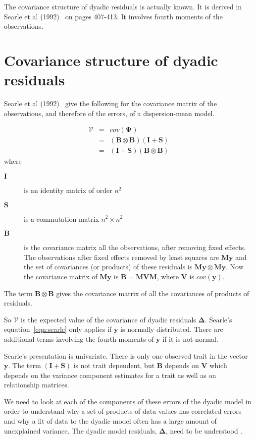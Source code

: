 \documentclass[titlepage]{article}  %
\begin{document}
The covariance structure of dyadic residuals is actually known. It is derived in Searle et al (1992)~\cite{sear:92} on pages 407-413. It involves fourth moments of the observations.

\section{Covariance structure of dyadic residuals}
 Searle et al (1992)~\cite{sear:92} give the following for the covariance matrix of the observations, and therefore of the errors, of a dispersion-mean model.

\begin{eqnarray}
\label{eqn:searle}
 \bm{\mathcal{V}} & = & cov(\bm{\Psi})  \\
          & = & (\bm{B} \otimes \bm{B}) (\bm{I} + \bm{S}) \\
          & = & (\bm{I} + \bm{S}) (\bm{B} \otimes \bm{B})
\end{eqnarray}
where
\begin{description}
\item[$\bm{I}$] is an identity matrix of order $n^{2}$
\item[$\bm{S}$] is a commutation matrix $n^{2} \times n^{2}$
\item[$\bm{B}$] is the covariance matrix  all the observations, after removing fixed effects. The observations after fixed effects removed by least squares are $\bm{M}\bm{y}$  and the set of covariances (or products) of these residuals is $\bm{M}\bm{y} \otimes \bm{M}\bm{y}$. Now the covariance  matrix of $\bm{M}\bm{y}$ is  $\bm{B} = \bm{M}\bm{V}\bm{M}$, where $\bm{V}$ is $cov(\bm{y})$. 
\end{description}
The term $\bm{B} \otimes \bm{B}$ gives the covariance matrix of all the covariances of products of residuals. 

So $\bm{\mathcal{V}}$ is the expected value of the covariance of dyadic residuals $\bm{\Delta}$. Searle's equation~\ref{eqn:searle} only applies if $\bm{y}$ is normally distributed. There are additional terms involving the fourth moments of $\bm{y}$ if it is not normal.

Searle's presentation is univariate. There is only one observed trait in the vector $\bm{y}$. The term $(\bm{I} + \bm{S})$ is not trait dependent, but $\bm{B}$ depends on $\bm{V}$ which depends on the variance component estimates for a trait as well as on relationship matrices.

We need to look at each of the components of these errors of the dyadic model in order to understand why a set of products of data values has correlated errors and why a fit of data to the dyadic model often has a large amount of unexplained variance. The dyadic model residuals, $\bm{\Delta}$, need to be understood .
\end{document}
